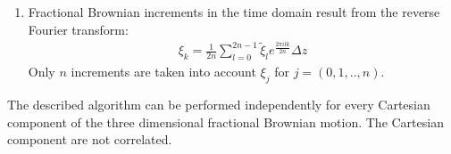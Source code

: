 \documentclass[
  a4paper,BCOR10mm,oneside,
  headsepline,footsepline,%
  fleqn,openbib
]{scrbook}
\begin{document}
\begin{enumerate}
 \item Fractional Brownian increments in the time domain result from the reverse Fourier transform:
 \begin{align}
 \xi_{k}= \frac{1}{2n} \sum_{l=0}^{2n-1}  \tilde{\xi}_l e^{\frac{2 \pi i l k }{2n}} \Delta z
 \end{align}
Only $n$ increments are taken into account $\xi_{j}$ for $j=(0,1,..,n)$.
\end{enumerate}
The described algorithm can be performed independently for every Cartesian component of the three dimensional fractional Brownian motion. The Cartesian component are not correlated.
\end{document}
